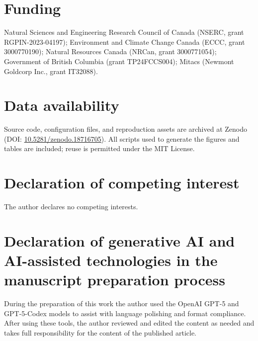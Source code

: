 \documentclass[review]{elsarticle}
\begin{document}
\section*{Funding}
Natural Sciences and Engineering Research Council of Canada (NSERC, grant RGPIN-2023-04197); Environment and Climate Change Canada (ECCC, grant 3000770190); Natural Resources Canada (NRCan, grant 3000771054); Government of British Columbia (grant TP24FCCS004); Mitacs (Newmont Goldcorp Inc., grant IT32088).

\section*{Data availability}
Source code, configuration files, and reproduction assets are archived at Zenodo (DOI: \url{10.5281/zenodo.18716705}). All scripts used to generate the figures and tables are included; reuse is permitted under the MIT License.

\section*{Declaration of competing interest}
The author declares no competing interests.

\section*{Declaration of generative AI and AI-assisted technologies in the manuscript preparation process}
During the preparation of this work the author used the OpenAI GPT-5 and GPT-5-Codex models to assist with language polishing and format compliance. After using these tools, the author reviewed and edited the content as needed and takes full responsibility for the content of the published article.



\end{document}

